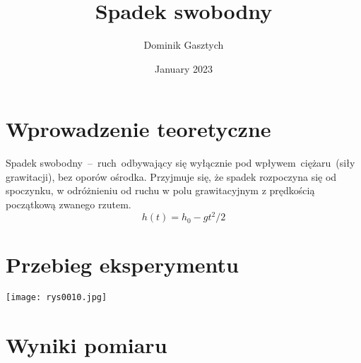\documentclass{article}
\title{Spadek swobodny}
\author{Dominik Gasztych}
\date{January 2023}
\begin{document}
\maketitle

\section{Wprowadzenie teoretyczne}
Spadek swobodny – ruch odbywający się wyłącznie pod
wpływem ciężaru (siły grawitacji), bez oporów ośrodka. Przyjmuje się, że spadek
rozpoczyna się od spoczynku, w odróżnieniu od ruchu w polu grawitacyjnym z
prędkością początkową zwanego rzutem.
\begin{equation}
    h(t)=h_0- gt^2/2
\end{equation}

\section{Przebieg eksperymentu}

\begin{center}
\texttt{[image: rys0010.jpg]}
\end{center}

\section{Wyniki pomiaru}
\end{document}
